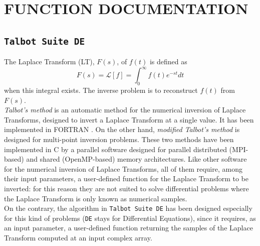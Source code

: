 \documentclass[a4paper,10pt]{report}%
\begin{document}
\chapter{FUNCTION DOCUMENTATION}\label{CHAPT1}
\setcounter{secnumdepth}{1}


\section{{\tt Talbot Suite DE}}\label{TSUITEDE}
The Laplace Transform (LT), $F(s)$, of $f(t)$ is defined as
\[
F(s) = \mathscr{L}[f] = \int_0^\infty f(t) e^{-st} dt
\]
when this integral exists. The inverse problem is to reconstruct $f(t)$ from $F(s)$.
\\
{\em Talbot's method} \cite{Talbot:1979} is an automatic method for the numerical inversion of Laplace
Transforms, designed to invert a Laplace Transform at a single value.
It has been implemented in FORTRAN \cite{Talbot:1990}.
On the other hand, {\em modified Talbot's method} \cite{Talbot:1995} is designed for multi-point
inversion problems.
These two methods have been implemented in C \cite{TALBOT_SUITE:2014} by a parallel software designed
for parallel distributed (MPI-based) and shared (OpenMP-based) memory architectures.
Like other software for the numerical inversion of Laplace Transforms, all of them require, among their
input parameters, a user-defined function for the Laplace Transform to be inverted: for this reason they
are not suited to solve differential problems where the Laplace Transform is only known as numerical
samples.
\\
On the contrary, the algorithm in {\tt Talbot Suite DE} \cite{Talbot:2016} has been designed especially
for this kind of problems ({\tt DE} stays for Differential Equations), since it requires, as an input
parameter, a user-defined function returning the samples of the Laplace Transform computed at an input
complex array.
\end{document}
